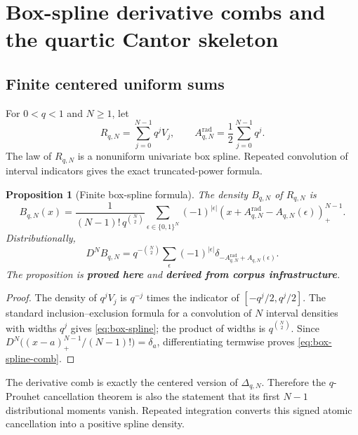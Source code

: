 \documentclass[11pt,oneside]{article}
\numberwithin{equation}{section}
\newtheorem{proposition}[theorem]{Proposition}
\theoremstyle{definition}
\theoremstyle{remark}
\newcommand{\proved}{\textcolor{deepgreen}{\textbf{proved here}}}
\newcommand{\derived}{\textcolor{linkblue}{\textbf{derived from corpus infrastructure}}}
\newcommand{\pospart}[1]{\left(#1\right)_{+}}
\newcommand{\Dcomb}{\Delta}
\begin{document}
\section{Box-spline derivative combs and the quartic Cantor skeleton}
\label{sec:comb}

\subsection{Finite centered uniform sums}

For $0<q<1$ and $N\ge1$, let
\begin{equation}
 R_{q,N}=\sum_{j=0}^{N-1}q^jV_j,
 \qquad
 A_{q,N}^{\mathrm{rad}}=\frac12\sum_{j=0}^{N-1}q^j.
 \label{eq:RqN}
\end{equation}
The law of $R_{q,N}$ is a nonuniform univariate box spline.  Repeated
convolution of interval indicators gives the exact truncated-power formula.

\begin{proposition}[Finite box-spline formula]
\label{prop:box-spline}
The density $B_{q,N}$ of $R_{q,N}$ is
\begin{equation}
 \boxed{
 B_{q,N}(x)=
 \frac{1}{(N-1)!\,q^{\binom N2}}
 \sum_{\epsilon\in\{0,1\}^N}(-1)^{|\epsilon|}
 \pospart{x+A_{q,N}^{\mathrm{rad}}-A_{q,N}(\epsilon)}^{N-1}.}
 \label{eq:box-spline}
\end{equation}
Distributionally,
\begin{equation}
 \boxed{
 D^NB_{q,N}=
 q^{-\binom N2}
 \sum_{\epsilon}(-1)^{|\epsilon|}
 \delta_{-A_{q,N}^{\mathrm{rad}}+A_{q,N}(\epsilon)}.}
 \label{eq:box-spline-comb}
\end{equation}
The proposition is \proved{} and \derived.
\end{proposition}

\begin{proof}
The density of $q^jV_j$ is $q^{-j}$ times the indicator of
$[-q^j/2,q^j/2]$.  The standard inclusion--exclusion formula for a convolution
of $N$ interval densities with widths $q^j$ gives \eqref{eq:box-spline}; the
product of widths is $q^{\binom N2}$.  Since
$D^N\bigl((x-a)_+^{N-1}/(N-1)!\bigr)=\delta_a$, differentiating termwise proves
\eqref{eq:box-spline-comb}.
\end{proof}

The derivative comb is exactly the centered version of
$\Dcomb_{q,N}$.  Therefore the $q$-Prouhet cancellation theorem is also the
statement that its first $N-1$ distributional moments vanish.  Repeated
integration converts this signed atomic cancellation into a positive spline
density.
\end{document}
